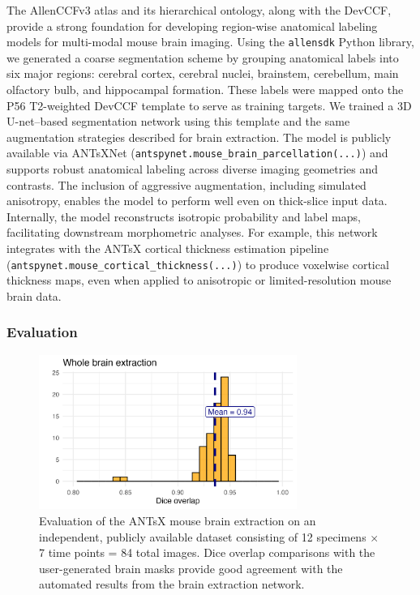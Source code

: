 \documentclass[
  12pt,
]{article}
\begin{document}
The AllenCCFv3 atlas and its hierarchical ontology, along with the
DevCCF, provide a strong foundation for developing region-wise
anatomical labeling models for multi-modal mouse brain imaging. Using
the \texttt{allensdk} Python library, we generated a coarse segmentation
scheme by grouping anatomical labels into six major regions: cerebral
cortex, cerebral nuclei, brainstem, cerebellum, main olfactory bulb, and
hippocampal formation. These labels were mapped onto the P56 T2-weighted
DevCCF template to serve as training targets. We trained a 3D
U-net--based segmentation network using this template and the same
augmentation strategies described for brain extraction. The model is
publicly available via ANTsXNet
(\texttt{antspynet.mouse\_brain\_parcellation(...)}) and supports robust
anatomical labeling across diverse imaging geometries and contrasts. The
inclusion of aggressive augmentation, including simulated anisotropy,
enables the model to perform well even on thick-slice input data.
Internally, the model reconstructs isotropic probability and label maps,
facilitating downstream morphometric analyses. For example, this network
integrates with the ANTsX cortical thickness estimation pipeline
(\texttt{antspynet.mouse\_cortical\_thickness(...)}) to produce
voxelwise cortical thickness maps, even when applied to anisotropic or
limited-resolution mouse brain data.

\subsubsection{Evaluation}\label{evaluation}

\begin{figure}
\centering
  \includegraphics[width=0.75\textwidth]{Figures/diceWholeBrain.png}
\caption{Evaluation of the ANTsX mouse brain extraction on an
independent, publicly available dataset consisting of 12 specimens $\times$ 7
time points = 84 total images.  Dice overlap comparisons with the
user-generated brain masks provide good agreement with the automated results
from the brain extraction network.}
\label{fig:evaluation}
\end{figure}
\end{document}
